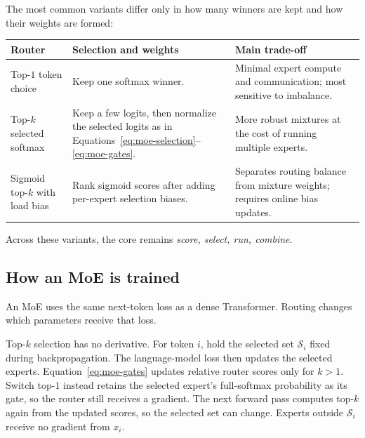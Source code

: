 \documentclass[11pt]{article}
\begin{document}
The most common variants differ only in how many winners are kept and how their
weights are formed:

\begin{center}
\small
\begin{tabularx}{\textwidth}{@{}>{\raggedright\arraybackslash}p{} X X@{}}
\toprule
Router & Selection and weights & Main trade-off \\
\midrule
Top-$1$ token choice \citep{fedus2022switch}
  & Keep one softmax winner.
  & Minimal expert compute and communication; most sensitive to imbalance. \\
Top-$k$ selected softmax \citep{jiang2024mixtral}
  & Keep a few logits, then normalize the selected logits as in
    Equations~\eqref{eq:moe-selection}--\eqref{eq:moe-gates}.
  & More robust mixtures at the cost of running multiple experts. \\
Sigmoid top-$k$ with load bias \citep{deepseekai2024deepseekv3}
  & Rank sigmoid scores after adding per-expert selection biases.
  & Separates routing balance from mixture weights; requires online bias updates. \\
\bottomrule
\end{tabularx}
\end{center}

Across these variants, the core remains \emph{score, select, run, combine}.

\subsection{How an MoE is trained}

An MoE uses the same next-token loss as a dense Transformer.  Routing changes
which parameters receive that loss.

Top-$k$ selection has no derivative.  For token $i$, hold the selected set
$\mathcal{S}_i$ fixed during backpropagation.  The language-model loss then
updates the selected experts.  Equation~\eqref{eq:moe-gates} updates relative
router scores only for $k>1$.  Switch top-$1$ instead retains the selected
expert's full-softmax probability as its gate, so the router still receives a
gradient.  The next
forward pass computes top-$k$ again from the updated scores, so the selected set
can change.  Experts outside $\mathcal{S}_i$ receive no gradient from $x_i$.
\end{document}
